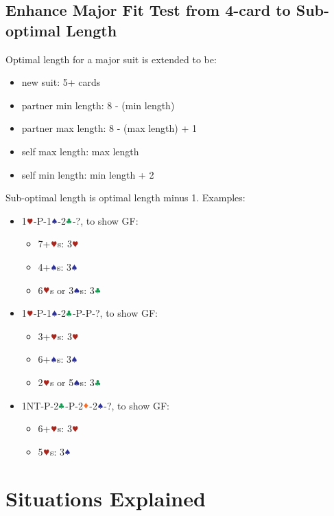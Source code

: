 \documentclass{article}
\newcommand*{\ccc}{\textcolor{ForestGreen}{\clubsuit}}
\newcommand*{\ddd}{\textcolor{Orange}{\vardiamondsuit}}
\newcommand*{\hhh}{\textcolor{Mahogany}{\varheartsuit}}
\newcommand*{\sss}{\textcolor{Blue}{\spadesuit}}
\begin{document}
\begin{multicols}{2}
\subsection{Enhance Major Fit Test from 4-card to Sub-optimal Length}
Optimal length for a major suit is extended to be:
\begin{itemize}
    \setlength\itemsep{-0.2em}
    \item new suit: 5+ cards
    \item partner min length: 8 - (min length)
    \item partner max length: 8 - (max length) + 1
    \item self max length: max length
    \item self min length: min length + 2
\end{itemize}
Sub-optimal length is optimal length minus 1. Examples:
\begin{itemize}
    \setlength\itemsep{-0.2em}
    \item 1$\hhh$-P-1$\sss$-2$\ccc$-?, to show GF:
    \begin{itemize}
        \setlength\itemsep{-0.2em}
        \item 7+$\hhh$s: 3$\hhh$
        \item 4+$\sss$s: 3$\sss$
        \item 6$\hhh$s or 3$\sss$s: 3$\ccc$
    \end{itemize}
    \item 1$\hhh$-P-1$\sss$-2$\ccc$-P-P-?, to show GF:
    \begin{itemize}
        \setlength\itemsep{-0.2em}
        \item 3+$\hhh$s: 3$\hhh$
        \item 6+$\sss$s: 3$\sss$
        \item 2$\hhh$s or 5$\sss$s: 3$\ccc$
    \end{itemize}
    \item 1NT-P-2$\ccc$-P-2$\ddd$-2$\sss$-?, to show GF:
    \begin{itemize}
        \setlength\itemsep{-0.2em}
        \item 6+$\hhh$s: 3$\hhh$
        \item 5$\hhh$s: 3$\sss$
    \end{itemize}
\end{itemize}

\section{Situations Explained}

\end{multicols}
\end{document}
